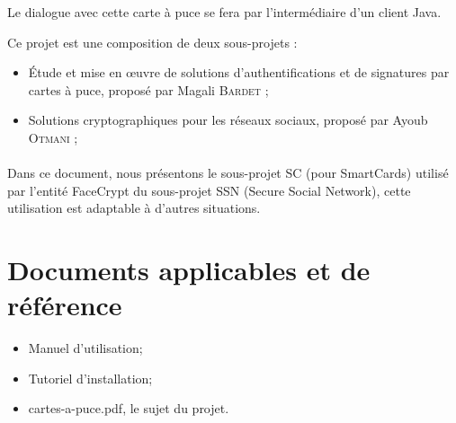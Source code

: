 \documentclass[a4paper,11pt,french]{article}
\begin{document}
Le dialogue avec cette carte à puce se fera par l’intermédiaire d’un 
client Java. 

Ce projet est une composition de deux sous-projets :
\begin{itemize}
    \item Étude et mise en \oe{}uvre de solutions d’authentifications et de signatures 
        par cartes à puce, proposé par Magali \textsc{Bardet} ;
\item Solutions cryptographiques pour les réseaux sociaux, proposé par Ayoub 
    \textsc{Otmani} ;
\end{itemize}

\paragraph{}
Dans ce document, nous présentons le sous-projet SC (pour SmartCards) utilisé 
par l'entité FaceCrypt du sous-projet SSN (Secure Social Network), cette
utilisation est adaptable à d'autres situations.

\section{Documents applicables et de référence}
\begin{itemize}
    \item Manuel d'utilisation;
    \item Tutoriel d'installation;
    \item cartes-a-puce.pdf, le sujet du projet.
\end{itemize}
\end{document}
